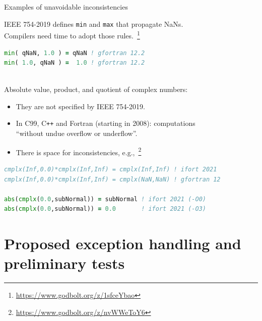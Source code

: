 \documentclass[11pt]{beamer}
\newcommand{\cpp}{{C\texttt{++}}}
\begin{document}

\begin{frame}[fragile]{Examples of unavoidable inconsistencies}

	IEEE 754-2019 defines \texttt{min} and \texttt{max} that propagate NaNs.\\
	Compilers need time to adopt those rules.~\footnote{\url{https://www.godbolt.org/z/1sfceYbao}}
	\begin{lstlisting}[language=Fortran]
min( qNaN, 1.0 ) = qNaN ! gfortran 12.2
min( 1.0, qNaN ) =  1.0 ! gfortran 12.2\end{lstlisting}
	
	~\\
	Absolute value, product, and quotient of complex numbers:
	\begin{itemize}
		\item They are not specified by IEEE 754-2019.
		\item In C99, \cpp{} and Fortran (starting in 2008): computations \\``without undue overflow or underflow''.
		\item There is space for inconsistencies, e.g.,~\footnote{\url{https://www.godbolt.org/z/nvWWeToY6}}
	\end{itemize}
	\begin{lstlisting}[language=Fortran]
cmplx(Inf,0.0)*cmplx(Inf,Inf) = cmplx(Inf,Inf) ! ifort 2021
cmplx(Inf,0.0)*cmplx(Inf,Inf) = cmplx(NaN,NaN) ! gfortran 12

abs(cmplx(0.0,subNormal)) = subNormal ! ifort 2021 (-O0)
abs(cmplx(0.0,subNormal)) = 0.0       ! ifort 2021 (-O3)\end{lstlisting}

\end{frame}

\section{Proposed exception handling and preliminary tests}
\end{document}
